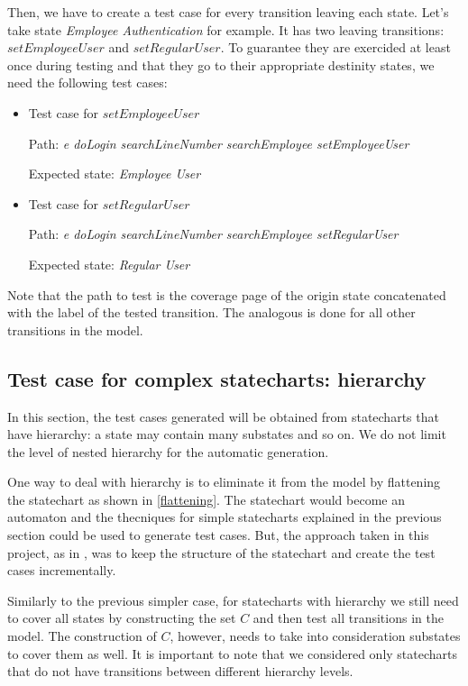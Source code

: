 Then, we have to create a test case for every transition leaving each state. Let's take state \textit{Employee Authentication} for example. It has two leaving transitions: $setEmployeeUser$ and $setRegularUser$. To guarantee they are exercided at least once during testing and that they go to their appropriate destinity states, we need the following test cases:

\begin{itemize}

\item Test case for \textit{\textbf{$setEmployeeUser$}}

Path: \textit{e doLogin searchLineNumber searchEmployee setEmployeeUser}

Expected state: \textit{Employee User}

\item Test case for \textit{\textbf{$setRegularUser$}}

Path: \textit{e doLogin searchLineNumber searchEmployee setRegularUser}

Expected state: \textit{Regular User}
\end{itemize}

Note that the path to test is the coverage page of the origin state concatenated with the label of the tested transition. The analogous is done for all other transitions in the model.

\subsection{Test case for complex statecharts: hierarchy}

In this section, the test cases generated will be obtained from statecharts that have hierarchy: a state may contain many substates and so on. We do not limit the level of nested hierarchy for the automatic generation.

One way to deal with hierarchy is to eliminate it from the model by flattening the statechart as shown in \ref{flattening}. The statechart would become an automaton and the thecniques for simple statecharts explained in the previous section could be used to generate test cases. But, the approach taken in this project, as in \cite{bogdanov}, was to keep the structure of the statechart and create the test cases incrementally.

Similarly to the previous simpler case, for statecharts with hierarchy we still need to cover all states by constructing the set $C$ and then test all transitions in the model. The construction of $C$, however, needs to take into consideration substates to cover them as well. It is important to note that we considered only statecharts that do not have transitions between different hierarchy levels.

